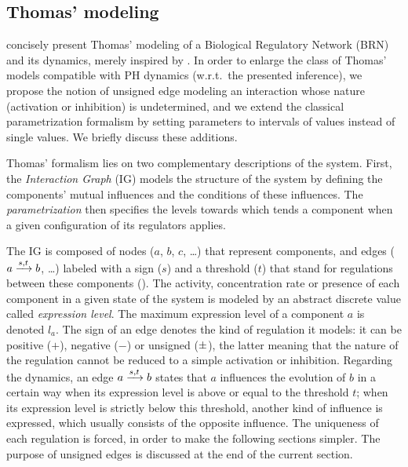 \subsection{Thomas' modeling}
\label{ssec:thomas}



 concisely present Thomas' modeling of a Biological Regulatory Network (BRN) and its dynamics, merely inspired by
\cite{Richard06,BernotSemBRN}.
In order to enlarge the class of Thomas' models compatible with PH dynamics (w.r.t.~the presented
inference),
we propose the notion of unsigned edge modeling an interaction whose nature (activation or inhibition) is undetermined,
and we extend the classical parametrization formalism by setting parameters to intervals of values instead of single values.
We briefly discuss these additions.

\medskip

Thomas' formalism lies on two complementary descriptions of the system. First, the
\emph{Interaction Graph} (IG) models the structure of the system by defining the components'
mutual influences and the conditions of these influences.
The \emph{parametrization} then specifies the levels towards which tends a component when a given
configuration of its regulators applies.

The IG is composed of nodes ($a$, $b$, $c$, …) that represent components,
and edges ($a \xrightarrow{s, t} b$, …) labeled with a sign ($s$) and a threshold ($t$) that stand for regulations between these components ().
The activity, concentration rate or presence of each component in a given state of the system is modeled by an abstract discrete value called \emph{expression level}.
The maximum expression level of a component $a$ is denoted $l_a$.
The sign of an edge denotes the kind of regulation it models: it can be positive ($+$), negative ($-$) or unsigned ($\pm$),
the latter meaning that the nature of the regulation cannot be reduced to a simple activation or inhibition.
Regarding the dynamics, an edge $a \xrightarrow{s, t} b$ states that $a$ influences the evolution of $b$ in a certain way when its expression level is above or equal to the threshold $t$;
when its expression level is strictly below this threshold, another kind of influence is expressed, which usually consists of the opposite influence.
The uniqueness of each regulation is forced, in order to make the following sections simpler.
The purpose of unsigned edges is discussed at the end of the current section.

